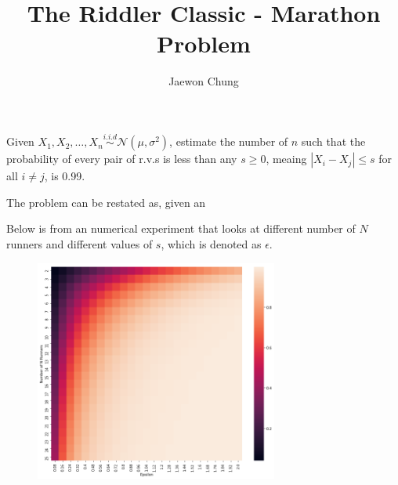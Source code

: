 \documentclass[12pt]{article}
\newenvironment{solution}[2][Solution]{\begin{trivlist}
\item[\hskip \labelsep {\bfseries #1}]}{\end{trivlist}}
\newenvironment{problem}[2][Problem]{\begin{trivlist}
\item[\hskip \labelsep {\bfseries #1}\hskip \labelsep {\bfseries #2.}]}{\end{trivlist}}
\begin{document}

\title{The Riddler Classic - Marathon Problem}%
\author{Jaewon Chung %
} %

\maketitle
\begin{problem}{(\href{https://fivethirtyeight.com/features/how-hard-is-it-to-find-a-running-buddy/}{538 Link})}
Given $X_1, X_2, \ldots, X_n \stackrel{i.i.d}{\sim} \mathcal{N}(\mu, \sigma^2)$, estimate the number of $n$ such
that the probability of every pair of r.v.s is less than any $s \geq 0$, 
meaing $|X_i - X_j| \leq s$ for all $i\neq j$, is 0.99.
\end{problem}

\begin{solution}{}
    The problem can be restated as, given an

    Below is from an numerical experiment that looks
    at different number of $N$ runners and different values
    of $s$, which is denoted as $\epsilon$.
    \begin{figure}[h]
    \centering
    \includegraphics[width=8cm]{heatmap_plot.png}
    \end{figure}
\end{solution}
\end{document}
